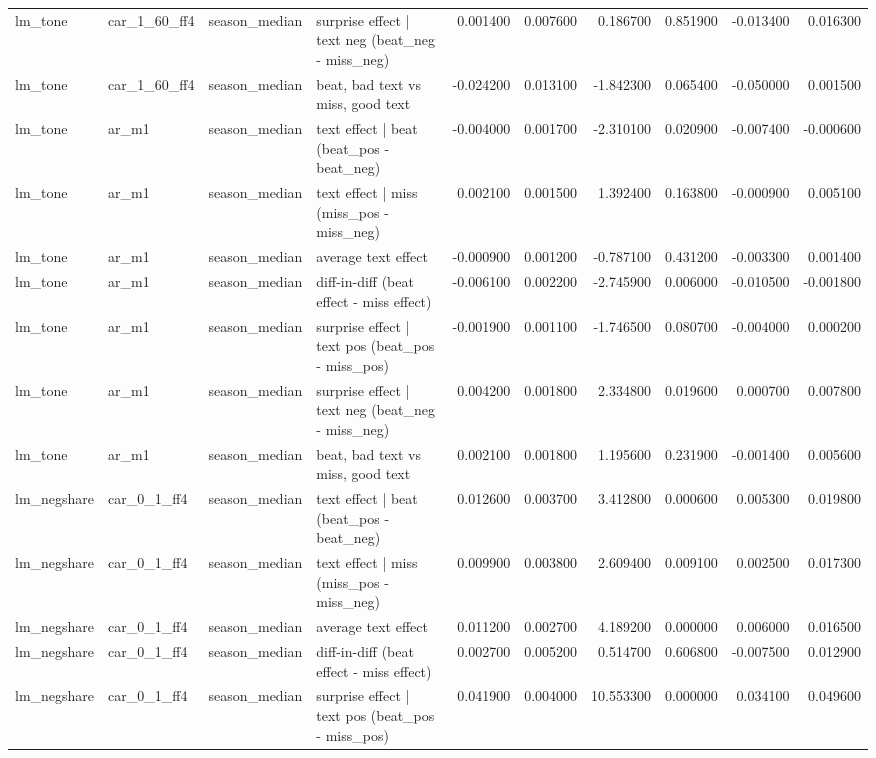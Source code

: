 \begin{table}
\begin{tabular}{llllrrrrrr}
lm\_tone & car\_1\_60\_ff4 & season\_median & surprise effect | text neg (beat\_neg - miss\_neg) & 0.001400 & 0.007600 & 0.186700 & 0.851900 & -0.013400 & 0.016300 \\
lm\_tone & car\_1\_60\_ff4 & season\_median & beat, bad text vs miss, good text & -0.024200 & 0.013100 & -1.842300 & 0.065400 & -0.050000 & 0.001500 \\
lm\_tone & ar\_m1 & season\_median & text effect | beat  (beat\_pos - beat\_neg) & -0.004000 & 0.001700 & -2.310100 & 0.020900 & -0.007400 & -0.000600 \\
lm\_tone & ar\_m1 & season\_median & text effect | miss  (miss\_pos - miss\_neg) & 0.002100 & 0.001500 & 1.392400 & 0.163800 & -0.000900 & 0.005100 \\
lm\_tone & ar\_m1 & season\_median & average text effect & -0.000900 & 0.001200 & -0.787100 & 0.431200 & -0.003300 & 0.001400 \\
lm\_tone & ar\_m1 & season\_median & diff-in-diff (beat effect - miss effect) & -0.006100 & 0.002200 & -2.745900 & 0.006000 & -0.010500 & -0.001800 \\
lm\_tone & ar\_m1 & season\_median & surprise effect | text pos (beat\_pos - miss\_pos) & -0.001900 & 0.001100 & -1.746500 & 0.080700 & -0.004000 & 0.000200 \\
lm\_tone & ar\_m1 & season\_median & surprise effect | text neg (beat\_neg - miss\_neg) & 0.004200 & 0.001800 & 2.334800 & 0.019600 & 0.000700 & 0.007800 \\
lm\_tone & ar\_m1 & season\_median & beat, bad text vs miss, good text & 0.002100 & 0.001800 & 1.195600 & 0.231900 & -0.001400 & 0.005600 \\
lm\_negshare & car\_0\_1\_ff4 & season\_median & text effect | beat  (beat\_pos - beat\_neg) & 0.012600 & 0.003700 & 3.412800 & 0.000600 & 0.005300 & 0.019800 \\
lm\_negshare & car\_0\_1\_ff4 & season\_median & text effect | miss  (miss\_pos - miss\_neg) & 0.009900 & 0.003800 & 2.609400 & 0.009100 & 0.002500 & 0.017300 \\
lm\_negshare & car\_0\_1\_ff4 & season\_median & average text effect & 0.011200 & 0.002700 & 4.189200 & 0.000000 & 0.006000 & 0.016500 \\
lm\_negshare & car\_0\_1\_ff4 & season\_median & diff-in-diff (beat effect - miss effect) & 0.002700 & 0.005200 & 0.514700 & 0.606800 & -0.007500 & 0.012900 \\
lm\_negshare & car\_0\_1\_ff4 & season\_median & surprise effect | text pos (beat\_pos - miss\_pos) & 0.041900 & 0.004000 & 10.553300 & 0.000000 & 0.034100 & 0.049600 \\

\end{tabular}
\end{table}
